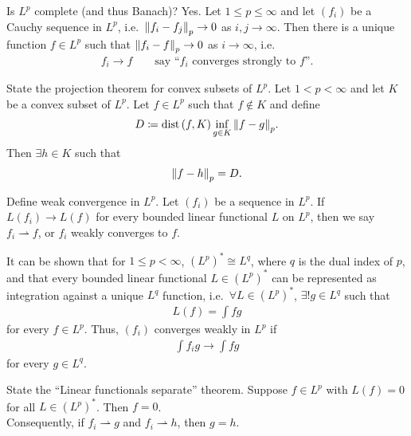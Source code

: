 \documentclass[avery5388,grid,frame]{flashcards}
\newcommand{\dist}{\mathrm{dist}\,}
\begin{document}
\begin{flashcard}
    {Is $L^p$ complete (and thus Banach)?}
    Yes.  Let $1 \leq p \leq \infty$ and let $(f_i)$ be a Cauchy sequence in $L^p$, i.e.~$\norm{f_i - f_j}_p \rightarrow 0$ as $i,j \rightarrow \infty$.  Then there is a unique function $f \in L^p$ such that $\norm{f_i - f}_p \rightarrow 0$ as $i \rightarrow \infty$, i.e.
    \begin{align*}
        f_i \rightarrow f \qquad \text{say ``$f_i$ converges strongly to $f$''.}
    \end{align*}
\end{flashcard}

\begin{flashcard}
    {State the projection theorem for convex subsets of $L^p$.}
    Let $1 < p < \infty$ and let $K$ be a convex subset of $L^p$.  Let $f \in L^p$ such that $f \not\in K$ and define
    \begin{align*}
        D \coloneqq \dist(f,K) \inf_{g \in K}\norm{f - g}_p.
    \end{align*}
    Then $\exists h \in K$ such that
    \begin{align*}
        \norm{f - h}_p = D.
    \end{align*}
\end{flashcard}

\begin{flashcard}
    {Define weak convergence in $L^p$.}
    Let $(f_i)$ be a sequence in $L^p$.  If $L(f_i) \rightarrow L(f)$ for every bounded linear functional $L$ on $L^p$, then we say $f_i \rightharpoonup f$, or $f_i$ weakly converges to $f$.

    It can be shown that for $1 \leq p < \infty$, $(L^p)^* \cong L^q$, where $q$ is the dual index of $p$, and that every bounded linear functional $L \in (L^p)^*$ can be represented as integration against a unique $L^q$ function, i.e.~$\forall L \in (L^p)^*$, $\exists!g\in L^q$ such that
    \begin{align*}
        L(f) = \int f g
    \end{align*}
    for every $f \in L^p$.  Thus, $(f_i)$ converges weakly in $L^p$ if
    \begin{align*}
        \int f_i g \rightarrow \int f g
    \end{align*}
    for every $g \in L^q$.
\end{flashcard}

\begin{flashcard}
    {State the ``Linear functionals separate'' theorem.}
    Suppose $f \in L^p$ with $L(f) = 0$ for all $L \in (L^p)^*$.  Then $f = 0$. \\

    Consequently, if $f_i \rightharpoonup g$ and $f_i \rightharpoonup h$, then $g = h$.
\end{flashcard}
\end{document}
